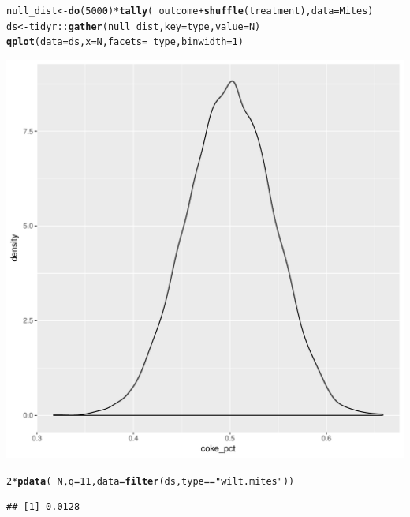 \documentclass[10pt]{article}\usepackage[]{graphicx}\usepackage[]{color}
\makeatletter
\def\maxwidth{ %
  \ifdim\Gin@nat@width>\linewidth
    \linewidth
  \else
    \Gin@nat@width
  \fi
}
\newcommand{\hlnum}[1]{\textcolor[rgb]{0.686,0.059,0.569}{#1}}%
\newcommand{\hlstr}[1]{\textcolor[rgb]{0.192,0.494,0.8}{#1}}%
\newcommand{\hlopt}[1]{\textcolor[rgb]{0,0,0}{#1}}%
\newcommand{\hlstd}[1]{\textcolor[rgb]{0.345,0.345,0.345}{#1}}%
\newcommand{\hlkwb}[1]{\textcolor[rgb]{0.69,0.353,0.396}{#1}}%
\newcommand{\hlkwc}[1]{\textcolor[rgb]{0.333,0.667,0.333}{#1}}%
\newcommand{\hlkwd}[1]{\textcolor[rgb]{0.737,0.353,0.396}{\textbf{#1}}}%
\newenvironment{kframe}{%
 \def\at@end@of@kframe{}%
 \ifinner\ifhmode%
  \def\at@end@of@kframe{\end{minipage}}%
  \begin{minipage}{\columnwidth}%
 \fi\fi%
 \def\FrameCommand##1{\hskip\@totalleftmargin \hskip-\fboxsep
 \colorbox{shadecolor}{##1}\hskip-\fboxsep
     \hskip-\linewidth \hskip-\@totalleftmargin \hskip\columnwidth}%
 \MakeFramed {\advance\hsize-\width
   \@totalleftmargin\z@ \linewidth\hsize
   \@setminipage}}%
 {\par\unskip\endMakeFramed%
 \at@end@of@kframe}
\newenvironment{knitrout}{}{} %
\makeatother
\begin{document}
\begin{knitrout}\footnotesize
{}\color{fgcolor}\begin{kframe}
\begin{alltt}
\hlstd{null_dist} \hlkwb{<-} \hlkwd{do}\hlstd{(}\hlnum{5000}\hlstd{)} \hlopt{*} \hlkwd{tally}\hlstd{(}\hlopt{~} \hlstd{outcome} \hlopt{+} \hlkwd{shuffle}\hlstd{(treatment),} \hlkwc{data} \hlstd{= Mites)}
\hlstd{ds} \hlkwb{<-} \hlstd{tidyr}\hlopt{::}\hlkwd{gather}\hlstd{(null_dist,} \hlkwc{key} \hlstd{= type,} \hlkwc{value} \hlstd{= N)}
\hlkwd{qplot}\hlstd{(}\hlkwc{data} \hlstd{= ds,} \hlkwc{x} \hlstd{= N,} \hlkwc{facets} \hlstd{=} \hlopt{~}\hlstd{type,} \hlkwc{binwidth} \hlstd{=} \hlnum{1}\hlstd{)}
\end{alltt}
\end{kframe}
\includegraphics[width=\maxwidth]{figure/unnamed-chunk-2-1} 
\begin{kframe}\begin{alltt}
\hlnum{2} \hlopt{*} \hlkwd{pdata}\hlstd{(}\hlopt{~}\hlstd{N,} \hlkwc{q} \hlstd{=} \hlnum{11}\hlstd{,} \hlkwc{data} \hlstd{=} \hlkwd{filter}\hlstd{(ds, type} \hlopt{==} \hlstr{"wilt.mites"}\hlstd{))}
\end{alltt}
\begin{verbatim}
## [1] 0.0128
\end{verbatim}

\end{kframe}
\end{knitrout}
\end{document}
